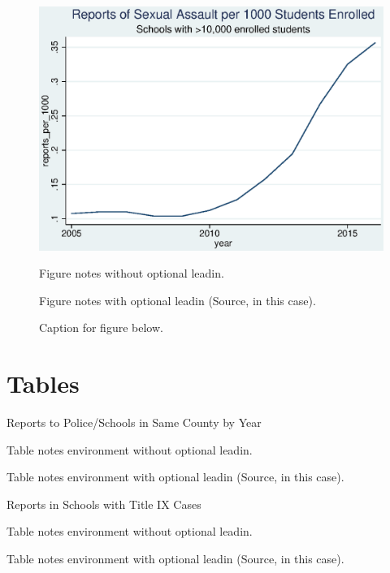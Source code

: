 \documentclass[AER]{AEA}
\begin{document}
\begin{figure}

\includegraphics[width=4.9in]{figures/school_reports.eps}

\caption{Caption for figure below.}
\begin{figurenotes}
Figure notes without optional leadin.
\end{figurenotes}
\begin{figurenotes}[Source]
Figure notes with optional leadin (Source, in this case).
\end{figurenotes}
\end{figure}


\section{Tables}

\begin{table}
\caption{Reports to Police/Schools in Same County by Year}



\begin{tablenotes}
Table notes environment without optional leadin.
\end{tablenotes}
\begin{tablenotes}[Source]
Table notes environment with optional leadin (Source, in this case).
\end{tablenotes}
\end{table}

\begin{table}
\caption{Reports in Schools with Title IX Cases}



\begin{tablenotes}
Table notes environment without optional leadin.
\end{tablenotes}
\begin{tablenotes}[Source]
Table notes environment with optional leadin (Source, in this case).
\end{tablenotes}
\end{table}
\end{document}
